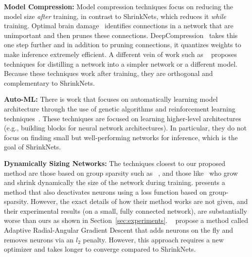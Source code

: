 
\noindent\textbf{Model Compression: }Model compression techniques focus on
reducing the model size \emph{after} training, in contrast to ShrinkNets, which
reduces it \emph{while} training. 
Optimal brain damage~\cite{Cun} identifies connections in a network that are
unimportant and then prunes these connections.
DeepCompression~\cite{han2015deepcompression} takes this one step further and in
addition to pruning connections, it quantizes weights to make inference
extremely efficient.  A different vein of work such as ~\cite{romero2014fitnets,
hinton2015distilling} proposes techniques for distilling a network into a
simpler network or a different model. Because these techniques work after
training, they are orthogonal and complementary to ShrinkNets. 

\noindent\textbf{Auto-ML: }There is work that focuses on automatically learning
model architecture through the use of genetic algorithms and reinforcement
learning techniques~\cite{DBLP:journals/corr/ZophL16, zoph2017learning}. These
techniques are focused on learning higher-level architectures (e.g.,
building blocks for neural network architectures). In particular, they do not
focus on finding small but well-performing networks for inference, which is the
goal of ShrinkNets.

\noindent\textbf{Dynamically Sizing Networks: }The techniques closest to our
proposed method are those based on group sparsity such as
~\cite{Scardapane2017}, and those like~\cite{Philipp} who grow and shrink
dynamically the size of the network during training.  \cite{Scardapane2017}
presents a method that also deactivates neurons using a loss function based on
group-sparsity.  However, the exact details of how their method works are not
given, and their experimental results (on a small, fully connected network), are
substantially worse than ours as shown in Section~\ref{sec:experiments}.
~\cite{Philipp} propose a method called Adaptive Radial-Angular Gradient Descent
that adds neurons on the fly and removes neurons via an $l_2$ penalty.  However,
this approach requires a new optimizer and takes longer to converge compared to
ShrinkNets.



